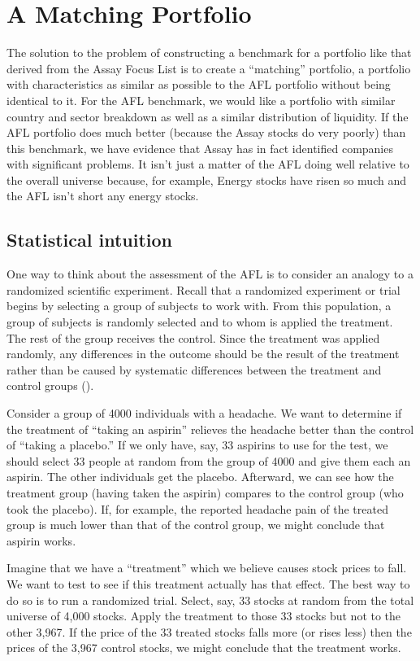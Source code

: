 \documentclass{article}
\begin{document}
\section{A Matching Portfolio}

The solution to the problem of constructing a benchmark for a
portfolio like that derived from the Assay Focus List is to create a
``matching'' portfolio, a portfolio with characteristics as similar as
possible to the AFL portfolio without being identical to it.  For the
AFL benchmark, we would like a portfolio with similar country and
sector breakdown as well as a similar distribution of liquidity. If
the AFL portfolio does much better (because the Assay stocks do very
poorly) than this benchmark, we have evidence that Assay has in fact
identified companies with significant problems. It isn't just a matter
of the AFL doing well relative to the overall universe because, for
example, Energy stocks have risen so much and the AFL isn't short any
energy stocks.


\subsection{Statistical intuition}

One way to think about the assessment of the AFL is to consider an
analogy to a randomized scientific experiment. Recall that a
randomized experiment or trial begins by selecting a group of subjects
to work with. From this population, a group of subjects is randomly
selected and to whom is applied the treatment. The rest of the group
receives the control. Since the treatment was applied randomly, any
differences in the outcome should be the result of the treatment
rather than be caused by systematic differences between the treatment
and control groups (\cite{rubin}).

Consider a group of 4000 individuals with a headache. We want to
determine if the treatment of ``taking an aspirin'' relieves the
headache better than the control of ``taking a placebo.'' If we only
have, say, 33 aspirins to use for the test, we should select 33 people
at random from the group of 4000 and give them each an aspirin. The
other individuals get the placebo. Afterward, we can see how the
treatment group (having taken the aspirin) compares to the control
group (who took the placebo). If, for example, the reported headache
pain of the treated group is much lower than that of the control
group, we might conclude that aspirin works.

Imagine that we have a ``treatment'' which we believe causes stock
prices to fall. We want to test to see if this treatment actually has
that effect. The best way to do so is to run a randomized trial.
Select, say, 33 stocks at random from the total universe of 4,000
stocks. Apply the treatment to those 33 stocks but not to the other
3,967. If the price of the 33 treated stocks falls more (or rises
less) then the prices of the 3,967 control stocks, we might conclude
that the treatment works.
\end{document}
